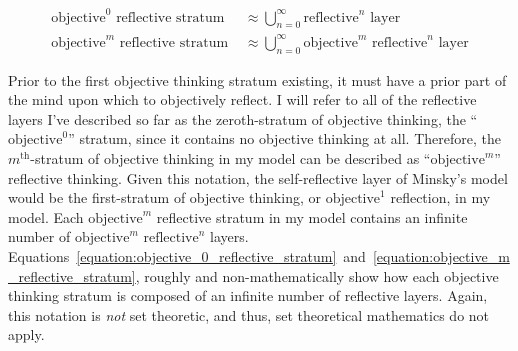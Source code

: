 \begin{align}
\label{equation:objective_0_reflective_stratum}
\text{objective}^0\text{ reflective stratum } &{\approx} \bigcup_{n=0}^{\infty}{\text{reflective}^n\text{ layer}} \\
\label{equation:objective_m_reflective_stratum}
\text{objective}^m\text{ reflective stratum } &{\approx} \bigcup_{n=0}^{\infty}{\text{objective}^m\text{ reflective}^n\text{ layer}}
\end{align}

Prior to the first objective thinking stratum existing, it must have a
prior part of the mind upon which to objectively reflect.  I will
refer to all of the reflective layers I've described so far as the
zeroth-stratum of objective thinking, the ``$\text{objective}^0$''
stratum, since it contains no objective thinking at all.  Therefore,
the $m^\text{th}$-stratum of objective thinking in my model can be
described as ``$\text{objective}^m$'' reflective thinking.  Given this
notation, the self-reflective layer of Minsky's model would be the
first-stratum of objective thinking, or $\text{objective}^1$ reflection,
in my model.  Each $\text{objective}^m$ reflective stratum in my model
contains an infinite number of $\text{objective}^m\text{ reflective}^n$
layers.
Equations~\ref{equation:objective_0_reflective_stratum}~and~\ref{equation:objective_m_reflective_stratum},
roughly and non-mathematically show how each objective thinking
stratum is composed of an infinite number of reflective layers.
Again, this notation is \emph{not} set theoretic, and thus, set
theoretical mathematics do not apply.


